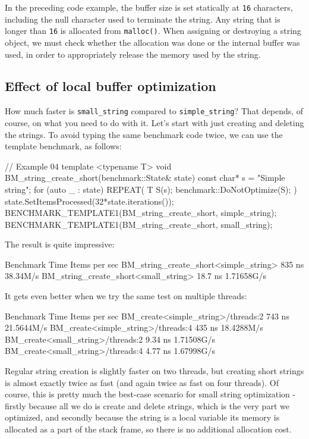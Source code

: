 In the preceding code example, the buffer size is set statically at \texttt{16} characters, including the null character used to terminate the string. Any string that is longer than \texttt{16} is allocated from \texttt{malloc()}. When assigning or destroying a string object, we must check whether the allocation was done or the internal buffer was used, in order to appropriately release the memory used by the string.

\subsection{Effect of local buffer optimization}

How much faster is \texttt{small\_string} compared to \texttt{simple\_string}? That depends, of course, on what you need to do with it. Let's start with just creating and deleting the strings. To avoid typing the same benchmark code twice, we can use the template benchmark, as follows:

\begin{code}
// Example 04
template <typename T>
void BM_string_create_short(benchmark::State& state) {
  const char* s = "Simple string";
  for (auto _ : state) {
    REPEAT({
      T S(s);
      benchmark::DoNotOptimize(S);
    })
  }
  state.SetItemsProcessed(32*state.iterations());
}
BENCHMARK_TEMPLATE1(BM_string_create_short, simple_string);
BENCHMARK_TEMPLATE1(BM_string_create_short, small_string);
\end{code}

The result is quite impressive:

\begin{code}
Benchmark                                Time Items per sec
BM_string_create_short<simple_string>     835 ns 38.34M/s
BM_string_create_short<small_string>     18.7 ns 1.71658G/s
\end{code}

It gets even better when we try the same test on multiple threads:

\begin{code}
Benchmark                                Time Items per sec
BM_create<simple_string>/threads:2        743 ns 21.5644M/s
BM_create<simple_string>/threads:4        435 ns 18.4288M/s
BM_create<small_string>/threads:2        9.34 ns 1.71508G/s
BM_create<small_string>/threads:4        4.77 ns 1.67998G/s
\end{code}

Regular string creation is slightly faster on two threads, but creating short strings is almost exactly twice as fast (and again twice as fast on four threads). Of course, this is pretty much the best-case scenario for small string optimization - firstly because all we do is create and delete strings, which is the very part we optimized, and secondly because the string is a local variable its memory is allocated as a part of the stack frame, so there is no additional allocation cost.

